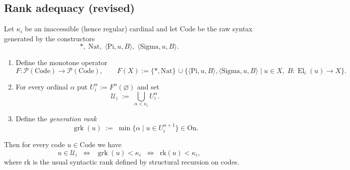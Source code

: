 \documentclass[a4paper,11pt]{article}
\newcommand{\El}{\operatorname{El}}          %
\begin{document}
\subsection{Rank adequacy (revised)}
\begin{lemma}\label{lem:rank-adequacy}
Let $\kappa_i$ be an inaccessible (hence regular) cardinal and let
$\mathrm{Code}$ be the raw syntax generated by the constructors
\[
  \ast,\;\mathrm{Nat},\;
  \langle\mathrm{Pi},u,B\rangle,\;
  \langle\mathrm{Sigma},u,B\rangle .
\]

\begin{enumerate}[(1)]
\item Define the monotone operator
\[
  F:\mathcal P(\mathrm{Code})\longrightarrow\mathcal P(\mathrm{Code}),\qquad
  F(X):=\{\ast,\mathrm{Nat}\}\,\cup\!
        \bigl\{\langle\mathrm{Pi},u,B\rangle,
               \langle\mathrm{Sigma},u,B\rangle
          \mid u\in X,\;B:\El_i(u)\to X
        \bigr\}.
\]
\item For every ordinal $\alpha$ put
      $U_i^{\alpha}:=F^{\alpha}(\varnothing)$ and set
      \[
        \mathcal U_i\;:=\;\bigcup_{\alpha<\kappa_i}U_i^{\alpha}.
      \]
\item Define the \emph{generation rank}
      \[
        \operatorname{grk}(u)\;:=\;
          \min\bigl\{\alpha\mid u\in U_i^{\alpha+1}\bigr\}\in\mathrm{On}.
      \]
\end{enumerate}
Then for every code $u\in\mathrm{Code}$ we have
\[
  u\in\mathcal U_i
  \;\;\Longleftrightarrow\;\;
  \operatorname{grk}(u)<\kappa_i
  \;\;\Longleftrightarrow\;\;
  \mathrm{rk}(u)<\kappa_i,
\]
where $\mathrm{rk}$ is the usual syntactic rank defined
by structural recursion on codes.
\end{lemma}
\end{document}
